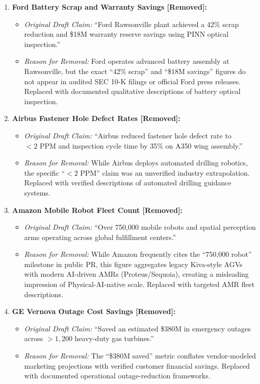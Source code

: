 \documentclass[11pt,a4paper]{article}
\begin{document}
\begin{enumerate}
    \item \textbf{Ford Battery Scrap and Warranty Savings [Removed]:}
    \begin{itemize}
        \item \textit{Original Draft Claim:} ``Ford Rawsonville plant achieved a 42\% scrap reduction and \$18M warranty reserve savings using PINN optical inspection.''
        \item \textit{Reason for Removal:} Ford operates advanced battery assembly at Rawsonville, but the exact ``42\% scrap'' and ``\$18M savings'' figures do not appear in audited SEC 10-K filings or official Ford press releases. Replaced with documented qualitative descriptions of battery optical inspection.
    \end{itemize}

    \item \textbf{Airbus Fastener Hole Defect Rates [Removed]:}
    \begin{itemize}
        \item \textit{Original Draft Claim:} ``Airbus reduced fastener hole defect rate to $<2\text{ PPM}$ and inspection cycle time by 35\% on A350 wing assembly.''
        \item \textit{Reason for Removal:} While Airbus deploys automated drilling robotics, the specific ``$<2\text{ PPM}$'' claim was an unverified industry extrapolation. Replaced with verified descriptions of automated drilling guidance systems.
    \end{itemize}

    \item \textbf{Amazon Mobile Robot Fleet Count [Removed]:}
    \begin{itemize}
        \item \textit{Original Draft Claim:} ``Over 750,000 mobile robots and spatial perception arms operating across global fulfillment centers.''
        \item \textit{Reason for Removal:} While Amazon frequently cites the ``750,000 robot'' milestone in public PR, this figure aggregates legacy Kiva-style AGVs with modern AI-driven AMRs (Proteus/Sequoia), creating a misleading impression of Physical-AI-native scale. Replaced with targeted AMR fleet descriptions.
    \end{itemize}

    \item \textbf{GE Vernova Outage Cost Savings [Removed]:}
    \begin{itemize}
        \item \textit{Original Draft Claim:} ``Saved an estimated \$380M in emergency outages across $>1,200$ heavy-duty gas turbines.''
        \item \textit{Reason for Removal:} The ``\$380M saved'' metric conflates vendor-modeled marketing projections with verified customer financial savings. Replaced with documented operational outage-reduction frameworks.
    \end{itemize}


\end{enumerate}
\end{document}
